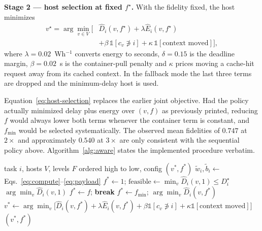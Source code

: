 \documentclass[journal,10pt]{IEEEtran}
\begin{document}
\textbf{Stage 2 --- host selection at fixed $f^{\star}$.}
With the fidelity fixed, the host minimizes
\begin{equation}
\begin{aligned}
  v^{\star}=\arg\min_{v\in V}\Big[&
    \hat D_i(v,f^{\star})+\lambda\hat E_i(v,f^{\star})\\
    &+\beta\,\mathbb{1}[c_v\not\ni i]
    +\kappa\,\mathbb{1}[\text{context moved}]\Big],
\end{aligned}
\label{eq:host-selection}
\end{equation}
where $\lambda=0.02$~Wh$^{-1}$ converts energy to seconds, $\delta=0.15$ is the
deadline margin, $\beta=0.02$~s is the container-pull penalty and $\kappa$ prices
moving a cache-hit request away from its cached context. In the fallback mode
the last three terms are dropped and the minimum-delay host is used.

Equation~\eqref{eq:host-selection} replaces the earlier joint objective. Had the
policy actually minimized delay plus energy over $(v,f)$ as previously printed,
reducing $f$ would always lower both terms whenever the container term is
constant, and $f_{\min}$ would be selected systematically. The observed mean
fidelities of $0.747$ at $2\times$ and approximately $0.540$ at $3\times$ are
only consistent with the sequential policy above. Algorithm~\ref{alg:aware}
states the implemented procedure verbatim.

\begin{algorithm}[t]
\caption{Sequential fidelity-then-host selection (implemented policy)}
\label{alg:aware}
\begin{algorithmic}[1]
\Require task $i$, hosts $V$, levels $F$ ordered high to low, config
\Ensure $(v^\ast,f^\ast)$
\State $\tilde w_i,\tilde b_i \gets$ Eqs.~\eqref{eq:compute}--\eqref{eq:payload}
  \State $f^\ast\gets 1$; $\text{feasible}\gets \min_v \hat D_i(v,1)\le D_i^\star$
  \State \Return $\arg\min_v \hat D_i(v,1)$
\EndIf
{}
   $f^\ast\gets f$; \textbf{break} \EndIf
\EndFor
{} $f^\ast\gets f_{\min}$;
  \Return $\arg\min_v \hat D_i(v,f^\ast)$ 
\EndIf
\State $v^\ast\gets\arg\min_v\bigl[\hat D_i(v,f^\ast)+\lambda\hat E_i(v,f^\ast)
  +\beta\mathbb{1}[c_v\not\ni i]+\kappa\mathbb{1}[\text{context moved}]\bigr]$
\State \Return $(v^\ast,f^\ast)$
\end{algorithmic}
\end{algorithm}
\end{document}
